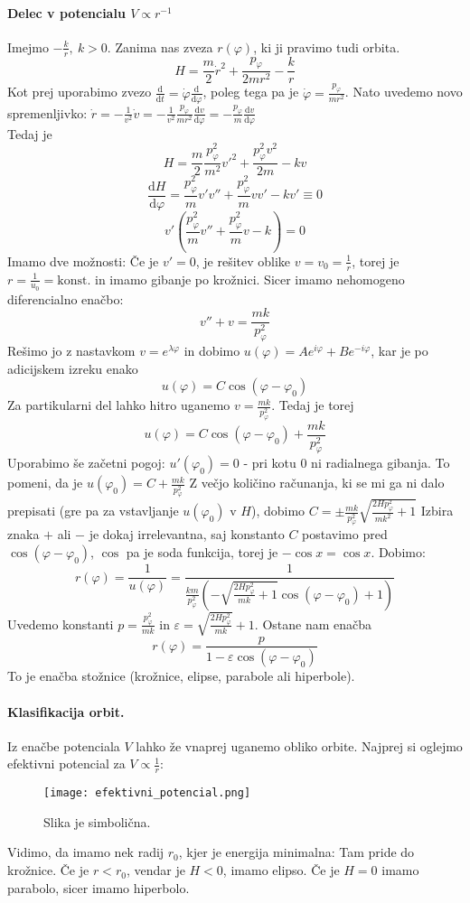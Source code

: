 \documentclass[a4paper]{article}
\newcommand{\dd}[2]{\frac{\mathrm{d} {#1}}{\mathrm{d} {#2}}}
\begin{document}
\paragraph{Delec v potencialu $V \propto r^{-1}$} Imejmo $\displaystyle{-\frac{k}{r}},~k>0$. Zanima nas zveza $r(\varphi)$, ki ji pravimo tudi orbita.
$$H = \frac{m}{2}\dot{r}^2 + \frac{p_\varphi}{2mr^2} - \frac{k}{r}$$
Kot prej uporabimo zvezo $\displaystyle{\dd{}{t} = \dot{\varphi}\dd{}{\varphi}}$, poleg tega pa je $\displaystyle{\dot{\varphi} = \frac{p_\varphi}{mr^2}}$. Nato uvedemo novo spremenljivko:
$\displaystyle{\dot{r} = -\frac{1}{v^2}\dot{v} = -\frac{1}{v^2}\frac{p_\varphi}{mr^2}\dd{v}{\varphi} = -\frac{p_\varphi}{m}\dd{v}{\varphi}}$ \\
Tedaj je $$H = \frac{m}{2}\frac{p_\varphi^2}{m^2}v'^2 + \frac{p_\varphi^2v^2}{2m}-kv$$
$$\dd{H}{\varphi} = \frac{p_\varphi^2}{m}v'v'' + \frac{p_\varphi^2}{m}vv' - kv' \equiv 0$$
$$v'\left(\frac{p_\varphi^2}{m}v'' + \frac{p_\varphi^2}{m}v - k\right)=0$$
Imamo dve možnosti: Če je $v' = 0$, je rešitev oblike $v = v_0 = \frac{1}{r}$, torej je $r = \frac{1}{u_0} = \text{konst.}$ in imamo gibanje po krožnici.
Sicer imamo nehomogeno diferencialno enačbo:
$$v'' + v = \frac{mk}{p_\varphi^2}$$
Rešimo jo z nastavkom $v = e^{\lambda\varphi}$ in dobimo $u(\varphi) = Ae^{i\varphi} + Be^{-i\varphi}$, kar je po adicijskem izreku enako
$$u(\varphi) = C\cos(\varphi - \varphi_0)$$
Za partikularni del lahko hitro uganemo $\displaystyle{v = \frac{mk}{p_\varphi^2}}$. Tedaj je torej
$$u(\varphi) = C\cos(\varphi - \varphi_0) + \frac{mk}{p_\varphi^2}$$
Uporabimo še začetni pogoj: $u'(\varphi_0) = 0$ - pri kotu 0 ni radialnega gibanja.
To pomeni, da je $u(\varphi_0)=C + \frac{mk}{p_\varphi^2}$
Z večjo količino računanja, ki se mi ga ni dalo prepisati (gre pa za vstavljanje $u(\varphi_0)$ v $H$), dobimo $C = \pm\frac{mk}{p_\varphi^2}\sqrt{\frac{2Hp_\varphi^2}{mk^2} + 1}$
Izbira znaka $+$ ali $-$ je dokaj irrelevantna, saj konstanto $C$ postavimo pred $\cos(\varphi - \varphi_0)$, $\cos$ pa je soda funkcija, torej je $-\cos x = \cos x$.
Dobimo:
$$r(\varphi) = \frac{1}{u(\varphi)} = \frac{1}{\frac{km}{p_\varphi^2}\left(-\sqrt{\frac{2Hp_\varphi^2}{mk} + 1}\cos(\varphi - \varphi_0) + 1\right)}$$
Uvedemo konstanti $\displaystyle{p = \frac{p_\varphi^2}{mk}}$ in $\displaystyle{\varepsilon = \sqrt{\frac{2Hp_\varphi^2}{mk}} + 1}$. Ostane nam enačba
$$r(\varphi) = \frac{p}{1 - \varepsilon\cos(\varphi - \varphi_0)}$$
To je enačba stožnice (krožnice, elipse, parabole ali hiperbole).
\paragraph{Klasifikacija orbit.} Iz enačbe potenciala $V$ lahko že vnaprej uganemo obliko orbite.
Najprej si oglejmo efektivni potencial za $\displaystyle{V \propto \frac{1}{r}}$:
\begin{figure}[h!]
    \centering
    \texttt{[image: efektivni\_potencial.png]}
    \caption{Slika je simbolična.}
\end{figure}
\newline
Vidimo, da imamo nek radij $r_0$, kjer je energija minimalna: Tam pride do krožnice. Če je $r<r_0$, vendar je $H < 0$, imamo elipso. Če je $H=0$ imamo parabolo, sicer imamo hiperbolo.
\end{document}
